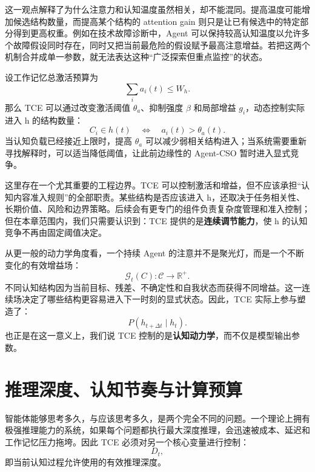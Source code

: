 这一观点解释了为什么注意力和认知温度虽然相关，却不能混同。提高温度可能增加候选结构数量，而提高某个结构的 attention gain 则只是让已有候选中的特定部分得到更高权重。例如在技术故障诊断中，Agent 可以保持较高认知温度以允许多个故障假设同时存在，同时又把当前最危险的假设赋予最高注意增益。若把这两个机制合并成单一参数，就无法表达这种“广泛探索但重点监控”的状态。

设工作记忆总激活预算为
\begin{equation}
    \sum_i a_i(t)\le W_h.
\end{equation}
那么 TCE 可以通过改变激活阈值 $\theta_a$、抑制强度 $\beta$ 和局部增益 $g_i$，动态控制实际进入 h 的结构数量：
\begin{equation}
    C_i\in h(t)
    \quad\Longleftrightarrow\quad
    a_i(t)>\theta_a(t).
\end{equation}
当认知负载已经接近上限时，提高 $\theta_a$ 可以减少弱相关结构进入；当系统需要重新寻找解释时，可以适当降低阈值，让此前边缘性的 Agent-CSO 暂时进入显式竞争。

这里存在一个尤其重要的工程边界。TCE 可以控制激活和增益，但不应该承担“认知内容准入规则”的全部职责。某些结构是否应该进入 h，还取决于任务相关性、长期价值、风险和边界策略。后续会有更专门的组件负责复杂度管理和准入控制；但在本章范围内，我们只需要认识到：TCE 提供的是\textbf{连续调节能力}，使 h 的认知竞争不再由固定阈值决定。

从更一般的动力学角度看，一个持续 Agent 的注意并不是聚光灯，而是一个不断变化的有效增益场：
\begin{equation}
    \mathcal G_t(C)
    :
    \mathcal C
    \rightarrow
    \mathbb R^+.
\end{equation}
不同认知结构因为当前目标、残差、不确定性和自我状态而获得不同增益。这一连续场决定了哪些结构更容易进入下一时刻的显式状态。因此，TCE 实际上参与塑造了：
\begin{equation}
    P(h_{t+\Delta t}\mid h_t).
\end{equation}
也正是在这一意义上，我们说 TCE 控制的是\textbf{认知动力学}，而不仅是模型输出参数。

\section{推理深度、认知节奏与计算预算}

智能体能够思考多久，与应该思考多久，是两个完全不同的问题。一个理论上拥有极强推理能力的系统，如果每个问题都执行最大深度推理，会迅速被成本、延迟和工作记忆压力拖垮。因此 TCE 必须对另一个核心变量进行控制：
\begin{equation}
    D_t,
\end{equation}
即当前认知过程允许使用的有效推理深度。

